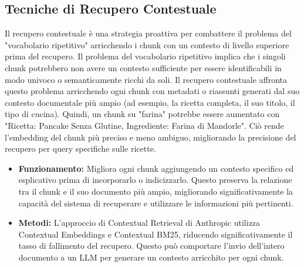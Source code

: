 \documentclass[a4paper, 11pt]{article}
\begin{document}
\subsection{Tecniche di Recupero Contestuale}
Il recupero contestuale è una strategia proattiva per combattere il problema del "vocabolario ripetitivo" arricchendo i chunk con un contesto di livello superiore prima del recupero. \cite{contextual_retrieval_pluralsight} Il problema del vocabolario ripetitivo implica che i singoli chunk potrebbero non avere un contesto sufficiente per essere identificabili in modo univoco o semanticamente ricchi da soli. \cite{contextual_retrieval_mlexpert} Il recupero contestuale affronta questo problema arricchendo ogni chunk con metadati o riassunti generati dal suo contesto documentale più ampio (ad esempio, la ricetta completa, il suo titolo, il tipo di cucina). Quindi, un chunk su "farina" potrebbe essere aumentato con "Ricetta: Pancake Senza Glutine, Ingrediente: Farina di Mandorle". Ciò rende l'embedding del chunk più preciso e meno ambiguo, migliorando la precisione del recupero per query specifiche sulle ricette.
\begin{itemize}
    \item \textbf{Funzionamento:} Migliora ogni chunk aggiungendo un contesto specifico ed esplicativo prima di incorporarlo o indicizzarlo. \cite{contextual_retrieval_pluralsight} Questo preserva la relazione tra il chunk e il suo documento più ampio, migliorando significativamente la capacità del sistema di recuperare e utilizzare le informazioni più pertinenti.
    \item \textbf{Metodi:} L'approccio di Contextual Retrieval di Anthropic \cite{contextual_retrieval_mlexpert} utilizza Contextual Embeddings e Contextual BM25, riducendo significativamente il tasso di fallimento del recupero. Questo può comportare l'invio dell'intero documento a un LLM per generare un contesto arricchito per ogni chunk. \cite{contextual_retrieval_somawansa}
\end{itemize}
\end{document}
